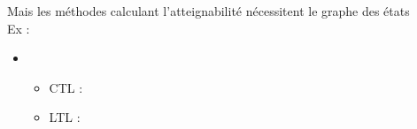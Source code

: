 \begin{frame}[c]
\pause
\medskip
Mais les méthodes calculant l'atteignabilité nécessitent le graphe des états\\
Ex : 
\begin{itemize}
  \item {}
  \begin{itemize}
    \item CTL : \tcite{\citesmbionet}
    \item LTL : \tcite{\citeito}
  \end{itemize}
\end{itemize}
\end{frame}
